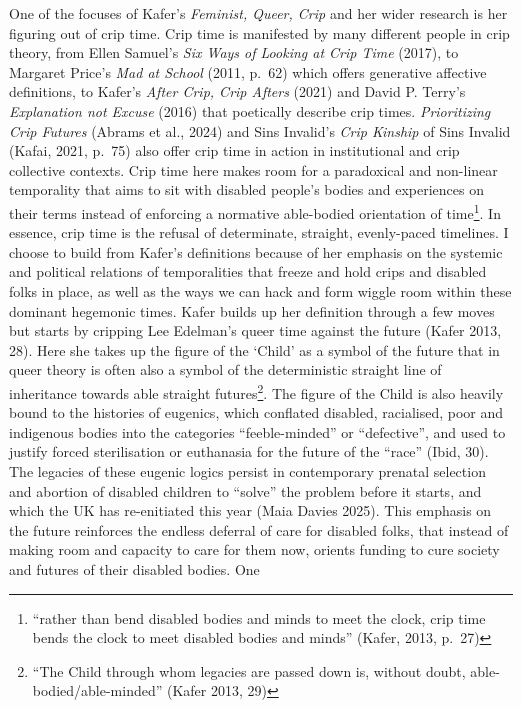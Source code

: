 One of the focuses of Kafer's \emph{Feminist, Queer, Crip} and her wider
research is her figuring out of crip time. Crip time is manifested by
many different people in crip theory, from Ellen Samuel's \emph{Six Ways
of Looking at Crip Time} (2017), to Margaret Price's \emph{Mad at
School} (2011, p.~62) which offers generative affective definitions, to
Kafer's \emph{After Crip, Crip Afters} (2021) and David P. Terry's
\emph{Explanation not Excuse} (2016) that poetically describe crip
times. \emph{Prioritizing Crip Futures} (Abrams et al., 2024) and Sins
Invalid's \emph{Crip Kinship} of Sins Invalid (Kafai, 2021, p.~75) also
offer crip time in action in institutional and crip collective contexts.
Crip time here makes room for a paradoxical and non-linear temporality
that aims to sit with disabled people's bodies and experiences on their
terms instead of enforcing a normative able-bodied orientation of
time\footnote{``rather than bend disabled bodies and minds to meet the
  clock, crip time bends the clock to meet disabled bodies and minds''
  (Kafer, 2013, p.~27)}. In essence, crip time is the refusal of
determinate, straight, evenly-paced timelines. I choose to build from
Kafer's definitions because of her emphasis on the systemic and
political relations of temporalities that freeze and hold crips and
disabled folks in place, as well as the ways we can hack and form wiggle
room within these dominant hegemonic times. Kafer builds up her
definition through a few moves but starts by cripping Lee Edelman's
queer time against the future (Kafer 2013, 28). Here she takes up the
figure of the `Child' as a symbol of the future that in queer theory is
often also a symbol of the deterministic straight line of inheritance
towards able straight futures\footnote{``The Child through whom legacies
  are passed down is, without doubt, able-bodied/able-minded'' (Kafer
  2013, 29)}. The figure of the Child is also heavily bound to the
histories of eugenics, which conflated disabled, racialised, poor and
indigenous bodies into the categories ``feeble-minded'' or
``defective'', and used to justify forced sterilisation or euthanasia
for the future of the ``race'' (Ibid, 30). The legacies of these eugenic
logics persist in contemporary prenatal selection and abortion of
disabled children to ``solve'' the problem before it starts, and which
the UK has re-enitiated this year (Maia Davies 2025). This emphasis on
the future reinforces the endless deferral of care for disabled folks,
that instead of making room and capacity to care for them now, orients
funding to cure society and futures of their disabled bodies. One
